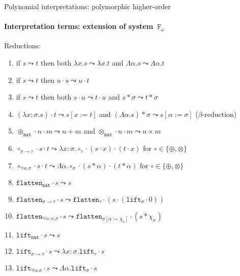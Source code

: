 \documentclass[10pt,presentation,color=names]{beamer}
\newcommand{\Fomega}{\mathtt{F}_\omega}
\newcommand{\arrtype}{\rightarrow}
\newcommand{\quant}[2]{\forall #1.#2}
\newcommand{\app}[2]{#1 \cdot #2}
\newcommand{\tapp}[2]{#1 * #2}
\newcommand{\subst}[2]{#1:=#2}
\newcommand{\abs}[2]{\lambda #1.#2}
\newcommand{\tabs}[2]{\Lambda #1.#2}
\newcommand{\arrW}{\leadsto}
\newcommand{\nat}{\mathtt{nat}}
\newcommand{\flatten}{\mathtt{flatten}}
\newcommand{\lift}{\mathtt{lift}}
\begin{document}
\begin{frame}{Polynomial interpretations: polymorphic higher-order}
  \framesubtitle{Interpretation terms: extension of system~$\Fomega$}
  Reductions:
  \begin{enumerate}
  \item\label{arrW:mono:abs}
    if $s \arrW t$ then both $\abs{x}{s} \arrW \abs{x}{t}$ and
    $\tabs{\alpha}{s} \arrW \tabs{\alpha}{t}$
  \item\label{arrW:mono:right}
    if $s \arrW t$ then $\app{u}{s} \arrW \app{u}{t}$
  \item\label{arrW:mono:left}
    if $s \arrW t$ then both $\app{s}{u} \arrW \app{t}{u}$ and
    $\tapp{s}{\sigma} \arrW \tapp{t}{\sigma}$
  \item\label{arrW:beta:abs} $\app{(\abs{x:\sigma}{s})}{t} \arrW
    s[\subst{x}{t}]$
    and
    $\tapp{(\tabs{\alpha}{s})}{\sigma}
    \arrW s[\subst{\alpha}{\sigma}]$
    ($\beta$-reduction)
  \item\label{arrW:plus:base}
    $\app{\app{\oplus_{\nat}}{n}}{m} \arrW n+m$
    and
    $\app{\app{\otimes_{\nat}}{n}}{m}
    \arrW n \times m$
  \item\label{arrW:circ:arrow} $\app{\app{\circ_{\sigma \arrtype
        \tau}}{s}}{t} \arrW
    \abs{x:\sigma}{\app{\app{\circ_\tau}{(\app{s}{x})}}{(\app{t}{x})}}$
    for $\circ \in \{ \oplus, \otimes \}$
  \item\label{arrW:circ:forall}
    $\app{\app{\circ_{\quant{\alpha}{\sigma}}}{s}}{t} \arrW
    \tabs{\alpha}{\app{\app{\circ_\sigma}{(\tapp{s}{\alpha})}}{(
        \tapp{t}{\alpha})}}$ for $\circ \in \{ \oplus, \otimes \}$
  \item $\app{\flatten_\nat}{s} \arrW s$
  \item $\app{\flatten_{\sigma \arrtype \tau}}{s} \arrW
    \app{\flatten_\tau}{(\app{s}{(\app{\lift_\sigma}{0})})}$
  \item $\app{\flatten_{\quant{\alpha:\kappa}{\sigma}}}{s} \arrW
    \app{\flatten_{\sigma[\subst{\alpha}{\chi_\kappa}]}}{(\tapp{s}{\chi_\kappa})}$
  \item $\app{\lift_\nat}{s} \arrW s$
  \item $\app{\lift_{\sigma \arrtype \tau}}{s} \arrW
    \abs{x:\sigma}{\app{\lift_{\tau}}{s}}$
  \item $\app{\lift_{\quant{\alpha}{\sigma}}}{s} \arrW
    \tabs{\alpha}{\app{\lift_{\sigma}}{s}}$
  \end{enumerate}
\end{frame}
\end{document}
